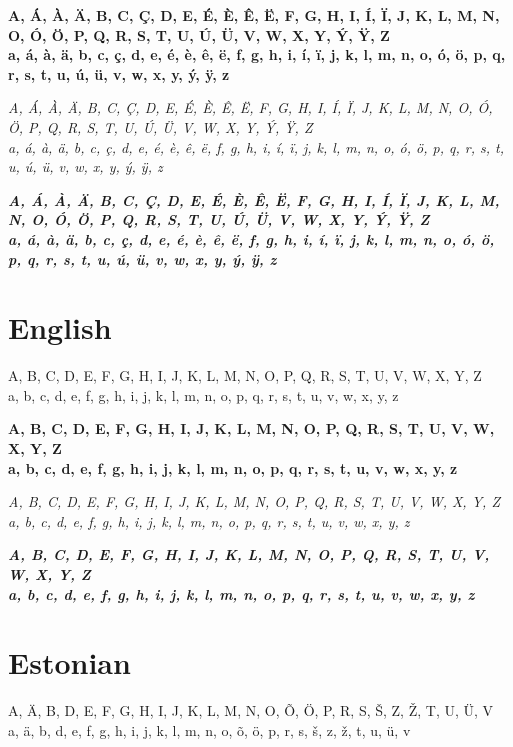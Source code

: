 \documentclass[12pt]{article}
\begin{document}
     

\textbf{
A, Á, À, Ä, B, C, Ç, D, E, É, È, Ê, Ë, F, G, H, I, Í, Ï, J, K, L, M, N, O, Ó, Ö, P, Q, R, S, T, U, Ú, Ü, V, W, X, Y, Ý, Ÿ, Z \\
a, á, à, ä, b, c, ç, d, e, é, è, ê, ë, f, g, h, i, í, ï, j, k, l, m, n, o, ó, ö, p, q, r, s, t, u, ú, ü, v, w, x, y, ý, ÿ, z
}

\textit{
A, Á, À, Ä, B, C, Ç, D, E, É, È, Ê, Ë, F, G, H, I, Í, Ï, J, K, L, M, N, O, Ó, Ö, P, Q, R, S, T, U, Ú, Ü, V, W, X, Y, Ý, Ÿ, Z \\
a, á, à, ä, b, c, ç, d, e, é, è, ê, ë, f, g, h, i, í, ï, j, k, l, m, n, o, ó, ö, p, q, r, s, t, u, ú, ü, v, w, x, y, ý, ÿ, z
}

\textbf{\textit{
A, Á, À, Ä, B, C, Ç, D, E, É, È, Ê, Ë, F, G, H, I, Í, Ï, J, K, L, M, N, O, Ó, Ö, P, Q, R, S, T, U, Ú, Ü, V, W, X, Y, Ý, Ÿ, Z \\
a, á, à, ä, b, c, ç, d, e, é, è, ê, ë, f, g, h, i, í, ï, j, k, l, m, n, o, ó, ö, p, q, r, s, t, u, ú, ü, v, w, x, y, ý, ÿ, z
}}


\section{English}
A, B, C, D, E, F, G, H, I, J, K, L, M, N, O, P, Q, R, S, T, U, V, W, X, Y, Z \\
a, b, c, d, e, f, g, h, i, j, k, l, m, n, o, p, q, r, s, t, u, v, w, x, y, z

\textbf{
A, B, C, D, E, F, G, H, I, J, K, L, M, N, O, P, Q, R, S, T, U, V, W, X, Y, Z \\
a, b, c, d, e, f, g, h, i, j, k, l, m, n, o, p, q, r, s, t, u, v, w, x, y, z
}

\textit{
A, B, C, D, E, F, G, H, I, J, K, L, M, N, O, P, Q, R, S, T, U, V, W, X, Y, Z \\
a, b, c, d, e, f, g, h, i, j, k, l, m, n, o, p, q, r, s, t, u, v, w, x, y, z
}

\textbf{\textit{
A, B, C, D, E, F, G, H, I, J, K, L, M, N, O, P, Q, R, S, T, U, V, W, X, Y, Z \\
a, b, c, d, e, f, g, h, i, j, k, l, m, n, o, p, q, r, s, t, u, v, w, x, y, z
}}


\clearpage
\section{Estonian}
A, Ä, B, D, E, F, G, H, I, J, K, L, M, N, O, Õ, Ö, P, R, S, Š, Z, Ž, T, U, Ü, V \\
a, ä, b, d, e, f, g, h, i, j, k, l, m, n, o, õ, ö, p, r, s, š, z, ž, t, u, ü, v
\end{document}
